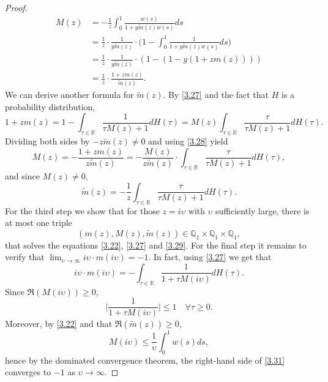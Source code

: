 \documentclass[a4paper,11pt]{book}
\theoremstyle{plain}
\theoremstyle{definition}
\newcommand{\MR}{\mathbb{R}}
\begin{document}
\begin{proof}
    	\begin{equation} \label{3.28}
    	\begin{aligned}
    	M(z) & = -\frac{1}{z} \int_{0}^{1} \frac{w(s)}{1+y\widetilde{m}(z) w(s)}ds \\
    	& = \frac{1}{z} \cdot \frac{1}{y\widetilde{m}(z)} \cdot \Big( 1 -  \int_{0}^{1} \frac{1}{1+y\widetilde{m}(z) w(s)}ds\Big)  \\
    	& = \frac{1}{z} \cdot \frac{1}{y\widetilde{m}(z)} \cdot ( 1 - (1 - y (1 + z m(z)) ) ) \\
    	& = \frac{1}{z} \cdot \frac{1 + zm(z)}{\widetilde{m}(z)}.
    	\end{aligned}
    	\end{equation}
    	We can derive another formula for $\widetilde{m}(z)$. By \eqref{3.27} and the fact that $H$ is a probability distribution,
    	\[ 1 + zm(z) = 1 - \int_{\tau \in \MR} \frac{1}{\tau M(z) + 1} dH(\tau) = M(z) \int_{\tau \in \MR} \frac{\tau}{\tau M(z) + 1} dH(\tau).  \]
    	Dividing both sides by $-z \widetilde{m}(z) \neq 0$ and using \eqref{3.28} yield
    	\[ M(z) = -\frac{1+zm(z)}{z\widetilde{m}(z)} = -\frac{M(z)}{z\widetilde{m}(z)} \cdot \int_{\tau \in \MR} \frac{\tau}{\tau M(z) + 1} dH(\tau),  \]
    	and since $M(z) \neq 0$,
    	\begin{equation} \label{3.29}
    		\widetilde{m}(z) = -\frac{1}{z} \int_{\tau \in \MR} \frac{\tau}{\tau M(z) + 1} dH(\tau).
    	\end{equation}
    	For the third step we show that for those $z = i \upsilon$ with $\upsilon$ sufficiently large, there is at most one triple
    	\[ (m(z), M(z), \widetilde{m}(z)) \in \mathbb{Q}_1 \times \mathbb{Q}_1 \times \mathbb{Q}_1, \]
    	that solves the equations \eqref{3.22}, \eqref{3.27} and \eqref{3.29}.
    	For the final step it remains to verify that $\lim_{\upsilon \rightarrow \infty} i \upsilon \cdot m(i \upsilon) = -1$. In fact, using \eqref{3.27} we get that
    	\begin{equation} \label{3.31}
    		i \upsilon \cdot m(i \upsilon)  = -\int_{\tau \in \MR} \frac{1}{ 1+\tau M(i \upsilon) }dH(\tau).
    	\end{equation}
    	Since $\Re(M(i \upsilon)) \geq 0$, 
    	\[ \Big| \frac{1}{1+\tau M(i\upsilon)}\Big|  \leq 1 \quad \forall \tau \geq 0. \]
    	Moreover, by \eqref{3.22} and that $\Re(\widetilde{m}(z)) \geq 0$,
    	\[ M(i \upsilon) \leq \frac{1}{\upsilon} \int_{0}^{1} w(s)ds, \]
    	hence by the dominated convergence theorem, the right-hand side of \eqref{3.31} converges to $-1$ as $\upsilon \rightarrow \infty$.
    \end{proof}
    
\end{document}
